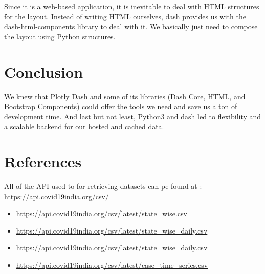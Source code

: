 \documentclass[11pt,a4paper]{report}
\begin{document}
    \noindent Since it is a web-based application, it is inevitable to deal with HTML structures for the layout. Instead of writing HTML ourselves, dash provides us with the dash-html-components library to deal with it. We basically just need to compose the layout using Python structures.

    \pagebreak
    \section*{Conclusion}
    We knew that Plotly Dash and some of its libraries (Dash Core, HTML, and Bootstrap Components) could offer the tools we need and save us a ton of development time. And last but not least, Python3 and dash led to flexibility and a scalable backend for our hosted and cached data. 

    \pagebreak
    \section*{References}
    All of the API used to for retrieving datasets can pe found at :\\
     \url{https://api.covid19india.org/csv/}
    \begin{itemize}
        \item  \url{https://api.covid19india.org/csv/latest/state_wise.csv}
        \item  \url{https://api.covid19india.org/csv/latest/state_wise_daily.csv}
        \item  \url{https://api.covid19india.org/csv/latest/state_wise_daily.csv}
        \item  \url{https://api.covid19india.org/csv/latest/case_time_series.csv}
    \end{itemize}
\end{document}
